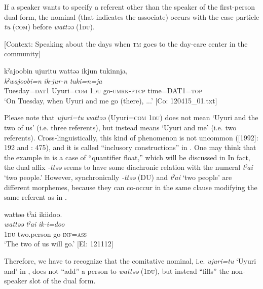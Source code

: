 If a speaker wants to specify a referent other than the speaker of the first-person dual form, the nominal (that indicates the associate) occurs with the case particle \textit{tu} (\textsc{com}) before \textit{wattəə} (1\textsc{du}).

\ea \label{ex:5:4}   [Context: Speaking about the days when \textsc{tm} goes to the day-care center in the community]

\glll  kˀajoobin  ujuritu  wattəə  ikjun  tukinnja,\\
\textit{kˀwajoobi}\footnotemark\textit{=n}  \textit{}  \textit{}  \textit{ik-jur-n}  \textit{tuki=n=ja}\\
Tuesday=\textsc{dat}1  Uyuri=\textsc{com}  1\textsc{du}  go-\textsc{umrk}-\textsc{ptcp}  time=DAT1=\textsc{top}\\
\glt ‘On Tuesday, when Uyuri and me go (there), ...’ [Co: 120415\_01.txt]
\z
{}

Please note that \textit{ujuri=tu} \textit{wattəə} (Uyuri=\textsc{com} 1\textsc{du}) does not mean ‘Uyuri and the two of us’ (i.e. three referents), but instead means ‘Uyuri and me’ (i.e. two referents). Cross-linguistically, this kind of phenomenon is not uncommon (\citealt{Jespersen1924}[1992]: 192 and \citealt{Moravcsik2003}: 475), and it is called “inclusory constructions” in \citet{Lichtenberk2000}. One may think that the example in  is a case of “quantifier float,” which will be discussed in  In fact, the dual affix \textit{{}-ttəə} seems to have some diachronic relation with the numeral \textit{tˀai} ‘two people.’ However, synchronically \textit{{}-ttəə} (DU) and \textit{tˀai} ‘two people’ are different morphemes, because they can co-occur in the same clause modifying the same referent as in .

\ea \label{ex:5:5}   %
\glll  wattəə  tˀai  ikiidoo.\\
\textit{wattəə}  \textit{tˀai}  \textit{ik-i=doo}\\
1\textsc{du}  two.person  go-\textsc{inf}=\textsc{ass}\\
\glt ‘The two of us will go.’ [El: 121112]
\z

Therefore, we have to recognize that the comitative nominal, i.e. \textit{ujuri=tu} ‘Uyuri and’ in , does not “add” a person to \textit{wattəə} (1\textsc{du}), but instead “fills” the non-speaker slot of the dual form.

